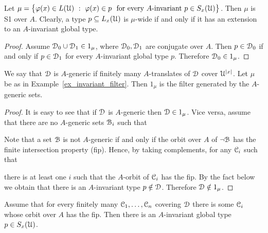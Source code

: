 \documentclass{amsproc}
\begin{document}
\begin{example}\label{ex_invariant_filter}
  Let $\mu=\big\{\varphi(x)\in L(\EuScript U)\ :\ \varphi(x)\in p\ {\rm\ for\ every\ } A\textrm{-invariant}\ p\in S_x(\EuScript U) \big\}$.
  Then $\mu$ is S1 over $A$.
  Clearly, a type $p\subseteq L_x(\EuScript U)$ is $\mu$-wide if and only if it has an extension to an $A$-invariant global type.
\end{example}

\begin{proof}
  Assume $\EuScript D_0\cup\EuScript D_1\in1_\mu$, where $\EuScript D_0,\EuScript D_1$ are conjugate over $A$.
  Then $p\in\EuScript D_0$ if and only if $p\in\EuScript D_1$ for every $A$-invariant global type $p$.
  Therefore $\EuScript D_0\in1_\mu$.
\end{proof}

\begin{example}
  We say that $\EuScript D$ is $A$-generic if finitely many $A$-translates of $\EuScript D$ cover $\EuScript U^{|x|}$.
  Let $\mu$ be as in Example~\ref{ex_invariant_filter}.
  Then $1_\mu$ is the filter generated by the $A$-generic sets.
\end{example}
  
\begin{proof}
  It is easy to see that if $\EuScript D$ is $A$-generic then $\EuScript D\in1_\mu$.
  Vice versa, assume that there are no $A$-generic sets $\EuScript B_i$ such that 


  Note that a set $\EuScript B$ is not $A$-generic if and only if the orbit over $A$ of $\neg\EuScript B$ has the finite intersection property (fip).
  Hence, by taking complements, for any $\EuScript C_i$ such that 
  

  there is at least one $i$ such that the $A$-orbit of $\EuScript C_i$ has the fip.
  By the fact below we obtain that there is an $A$-invariant type $p\notin\EuScript D$.
  Therefore $\EuScript D\notin1_\mu$.
\end{proof}

\begin{fact}
  Assume that for every finitely many $\EuScript C_1,\dots,\EuScript C_n$ covering $\EuScript D$ there is some $\EuScript C_i$ whose orbit over $A$ has the fip.
  Then there is an $A$-invariant global type $p\in S_x(\EuScript U)$.
\end{fact}
\end{document}
